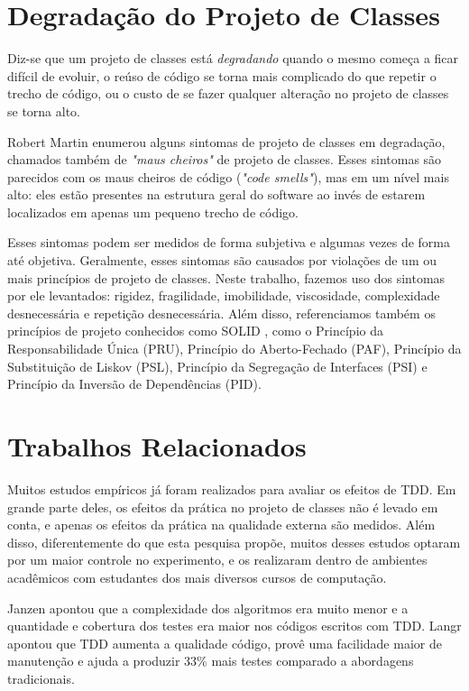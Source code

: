 \documentclass[conference]{IEEEtran}
\begin{document}
\section{Degradação do Projeto de Classes}

Diz-se que um projeto de classes está \textit{degradando}
quando o mesmo começa a ficar difícil de evoluir, o reúso de código se 
torna mais complicado do que repetir o trecho de código, ou o custo de se fazer 
qualquer alteração no projeto de classes se torna alto.

Robert Martin \cite{bob-martin} enumerou alguns sintomas de projeto de classes em degradação, 
chamados também de \textit{"maus cheiros"} de projeto de classes. Esses sintomas são parecidos com os 
maus cheiros de código (\textit{"code smells"}), mas em um nível mais alto: eles
estão presentes na estrutura geral do software ao invés de estarem localizados
em apenas um pequeno trecho de código.

Esses sintomas podem ser medidos de forma subjetiva e algumas vezes de forma 
até objetiva. Geralmente, esses sintomas são causados por violações de um ou 
mais princípios de projeto de classes.
Neste trabalho, fazemos uso dos sintomas por ele levantados: rigidez, fragilidade, imobilidade, 
viscosidade, complexidade desnecessária e repetição desnecessária. Além disso, referenciamos também
os princípios de projeto conhecidos como SOLID \cite{bob-martin}, 
como o Princípio da Responsabilidade Única (PRU), Princípio do Aberto-Fechado (PAF),
Princípio da Substituição de Liskov (PSL), Princípio da Segregação de Interfaces (PSI) e Princípio da
Inversão de Dependências (PID).

\section{Trabalhos Relacionados}
\label{cap:trabalhos-relacionados}

Muitos estudos empíricos já foram realizados para avaliar os efeitos de TDD.
Em grande parte deles, os efeitos da prática no projeto de classes não é 
levado em conta, e apenas os efeitos da prática na qualidade externa são medidos.
Além disso, diferentemente
do que esta pesquisa propõe, muitos desses estudos optaram por um
maior controle no experimento, e os realizaram dentro de ambientes acadêmicos 
com estudantes dos mais diversos cursos de computação.

Janzen \cite{janzen-arch-improvement} 
apontou que a complexidade dos algoritmos era muito menor e a quantidade e
cobertura dos testes era maior nos códigos escritos com TDD.
Langr \cite{langr} apontou que TDD aumenta a qualidade código, provê uma 
facilidade maior de manutenção e ajuda a produzir 33\% mais testes comparado a
abordagens tradicionais.
\end{document}
